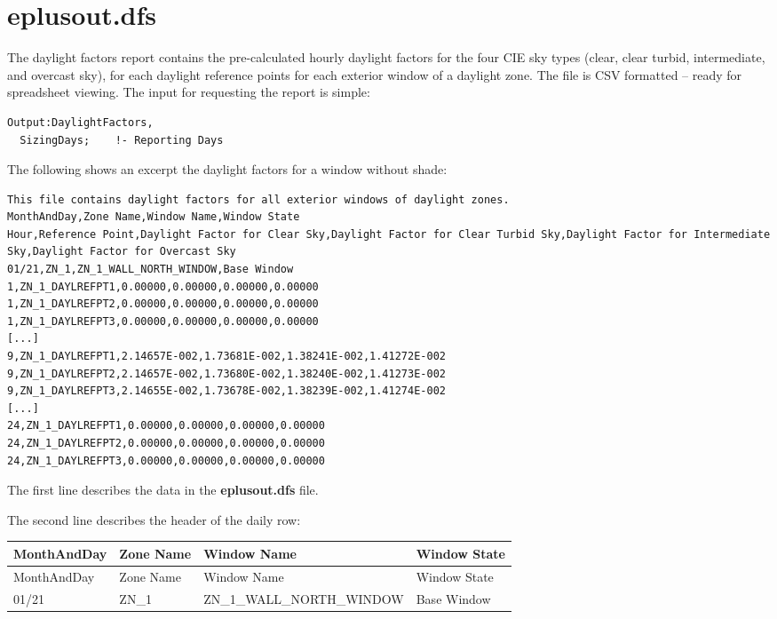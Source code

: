 \section{eplusout.dfs}\label{eplusout.dfs}

The daylight factors report contains the pre-calculated hourly daylight factors for the four CIE sky types (clear, clear turbid, intermediate, and overcast sky), for each daylight reference points for each exterior window of a daylight zone. The file is CSV formatted -- ready for spreadsheet viewing. The input for requesting the report is simple:

\begin{lstlisting}
Output:DaylightFactors,
  SizingDays;    !- Reporting Days
\end{lstlisting}

The following shows an excerpt the daylight factors for a window without shade:

\begin{lstlisting}
This file contains daylight factors for all exterior windows of daylight zones.
MonthAndDay,Zone Name,Window Name,Window State
Hour,Reference Point,Daylight Factor for Clear Sky,Daylight Factor for Clear Turbid Sky,Daylight Factor for Intermediate Sky,Daylight Factor for Overcast Sky
01/21,ZN_1,ZN_1_WALL_NORTH_WINDOW,Base Window
1,ZN_1_DAYLREFPT1,0.00000,0.00000,0.00000,0.00000
1,ZN_1_DAYLREFPT2,0.00000,0.00000,0.00000,0.00000
1,ZN_1_DAYLREFPT3,0.00000,0.00000,0.00000,0.00000
[...]
9,ZN_1_DAYLREFPT1,2.14657E-002,1.73681E-002,1.38241E-002,1.41272E-002
9,ZN_1_DAYLREFPT2,2.14657E-002,1.73680E-002,1.38240E-002,1.41273E-002
9,ZN_1_DAYLREFPT3,2.14655E-002,1.73678E-002,1.38239E-002,1.41274E-002
[...]
24,ZN_1_DAYLREFPT1,0.00000,0.00000,0.00000,0.00000
24,ZN_1_DAYLREFPT2,0.00000,0.00000,0.00000,0.00000
24,ZN_1_DAYLREFPT3,0.00000,0.00000,0.00000,0.00000
\end{lstlisting}

The first line describes the data in the \textbf{eplusout.dfs} file.

The second line describes the header of the daily row:

{\scriptsize
\begin{longtable}[c]{>{\raggedright}p{1.0in}>{\raggedright}p{1.0in}>{\raggedright}p{2.5in}>{\raggedright}p{1.5in}}
\toprule
MonthAndDay & Zone Name & Window Name & Window State \tabularnewline
\midrule
\endfirsthead

\toprule
MonthAndDay & Zone Name & Window Name & Window State \tabularnewline
\midrule
\endhead

01/21 & ZN\_1 & ZN\_1\_WALL\_NORTH\_WINDOW & Base Window \tabularnewline
\bottomrule
\end{longtable}}

